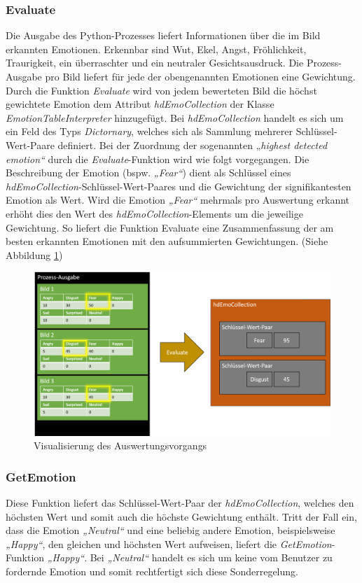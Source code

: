 \documentclass[10pt,a4paper]{report}
\begin{document}
\subsubsection{Evaluate}
Die Ausgabe des Python-Prozesses liefert Informationen über die im Bild erkannten Emotionen. Erkennbar sind Wut, Ekel, Angst, Fröhlichkeit, Traurigkeit, ein überraschter und ein neutraler Gesichtsausdruck. Die Prozess-Ausgabe pro Bild liefert für jede der obengenannten Emotionen eine Gewichtung. Durch die Funktion \textit{Evaluate} wird von jedem bewerteten Bild die höchst gewichtete Emotion dem Attribut \textit{hdEmoCollection} der Klasse \textit{EmotionTableInterpreter} hinzugefügt. Bei \textit{hdEmoCollection} handelt es sich um ein Feld des Typs \textit{Dictornary}, welches sich als Sammlung mehrerer Schlüssel-Wert-Paare definiert. Bei der Zuordnung der sogenannten „\textit{highest detected emotion“} durch die \textit{Evaluate}-Funktion wird wie folgt vorgegangen. Die Beschreibung der Emotion (bspw. \textit{„Fear“}) dient als Schlüssel eines \textit{hdEmoCollection}-Schlüssel-Wert-Paares und die Gewichtung der signifikantesten Emotion als Wert. Wird die Emotion \textit{„Fear“} mehrmals pro Auswertung erkannt erhöht dies den Wert des \textit{hdEmoCollection}-Elements um die jeweilige Gewichtung. So liefert die Funktion Evaluate eine Zusammenfassung der am besten erkannten Emotionen mit den aufsummierten Gewichtungen. (Siehe Abbildung \ref{fig:VisualisierungEvaluation})
 \begin{figure}
\includegraphics[scale=0.5]{Evaluate_Veranschaulichung.png}
 \caption{Visualisierung des Auswertungsvorgangs}
 \label{fig:VisualisierungEvaluation}
 \end{figure}
\subsubsection{GetEmotion}
Diese Funktion liefert das Schlüssel-Wert-Paar der \textit{hdEmoCollection}, welches den höchsten Wert und somit auch die höchste Gewichtung enthält. Tritt der Fall ein, dass die Emotion \textit{„Neutral“} und eine beliebig andere Emotion, beispielsweise \textit{„Happy“}, den gleichen und höchsten Wert aufweisen, liefert die \textit{GetEmotion}-Funktion \textit{„Happy“}. Bei \textit{„Neutral“} handelt es sich um keine vom Benutzer zu fordernde Emotion und somit rechtfertigt sich diese Sonderregelung.
\end{document}
